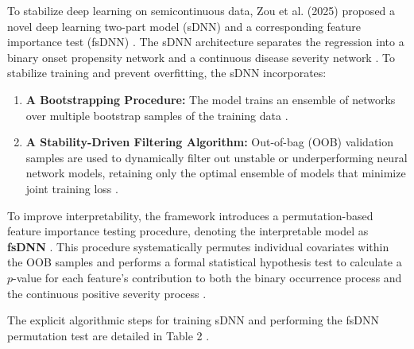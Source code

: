 To stabilize deep learning on semicontinuous data, Zou et al. (2025) proposed a novel deep learning two-part model (sDNN) and a corresponding feature importance test (fsDNN) \cite{zou2025sdnn, zou2025fsdnn, zou2025selection}. The sDNN architecture separates the regression into a binary onset propensity network and a continuous disease severity network \cite{zou2025sdnn}. To stabilize training and prevent overfitting, the sDNN incorporates:
\begin{enumerate}
    \item \textbf{A Bootstrapping Procedure:} The model trains an ensemble of networks over multiple bootstrap samples of the training data \cite{zou2025sdnn, zou2025fsdnn}.
    \item \textbf{A Stability-Driven Filtering Algorithm:} Out-of-bag (OOB) validation samples are used to dynamically filter out unstable or underperforming neural network models, retaining only the optimal ensemble of models that minimize joint training loss \cite{zou2025sdnn, zou2025fsdnn}.
\end{enumerate}

To improve interpretability, the framework introduces a permutation-based feature importance testing procedure, denoting the interpretable model as \textbf{fsDNN} \cite{zou2025sdnn, zou2025fsdnn}. This procedure systematically permutes individual covariates within the OOB samples and performs a formal statistical hypothesis test to calculate a $p$-value for each feature's contribution to both the binary occurrence process and the continuous positive severity process \cite{zou2025sdnn}. 

The explicit algorithmic steps for training sDNN and performing the fsDNN permutation test are detailed in Table 2 \cite{zou2025sdnn}.

